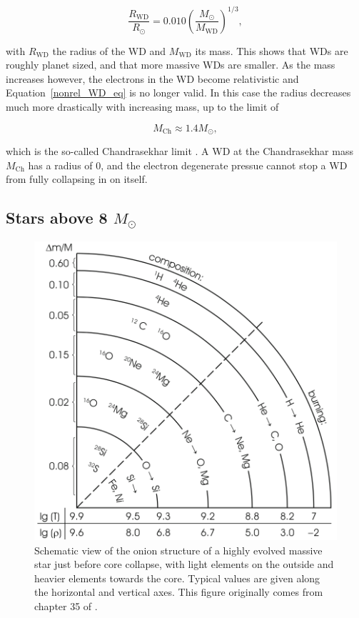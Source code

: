 \documentclass[a4paper,oneside,12pt, class=Latex/Classes/PhDthesisPSnPDF, crop=false]{standalone}
\begin{document}
\begin{equation}
    \label{nonrel_WD_eq}
    \frac{R_\text{WD}}{R_\odot} = 0.010 \left(\frac{M_\odot}{M_\text{WD}}\right)^{1/3},
\end{equation}

with $R_\text{WD}$ the radius of the WD and $M_\text{WD}$ its mass. This shows that WDs are roughly planet sized, and that more massive WDs are smaller. As the mass increases however, the electrons in the WD become relativistic and Equation~\ref{nonrel_WD_eq} is no longer valid. In this case the radius decreases much more drastically with increasing mass, up to the limit of 

\begin{equation}
    \label{Chandrasekhar_lim}
    M_\text{Ch} \approx 1.4 M_\odot,
\end{equation}

which is the so-called Chandrasekhar limit \citep{Chandrasekhar_lim}. A WD at the Chandrasekhar mass $M_\text{Ch}$ has a radius of 0, and the electron degenerate pressue cannot stop a WD from fully collapsing in on itself.


\subsection{Stars above 8 $M_\odot$}
\label{ge_8_Msol}

\begin{figure}
    \centering
    \includegraphics[width=\textwidth]{../Images/chapter_1/starstruct.png}
    \caption{Schematic view of the onion structure of a highly evolved massive star just before core collapse, with light elements on the outside and heavier elements towards the core. Typical values are given along the horizontal and vertical axes. This figure originally comes from chapter 35 of \citet{starstruct}.}
    \label{startstruct}
\end{figure}
\end{document}
